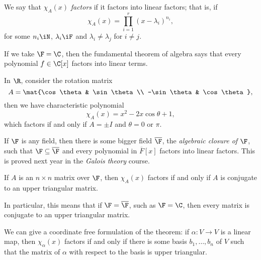 \begin{definition}
	We say that $\chi_A(x)$ \emph{factors} if it factors into linear factors; that is, if %
	\begin{equation*}
		\chi_A(x) =\prod_{i=1}^r \left( x-\lambda_i \right)^{n_i}, %
	\end{equation*}
	for some $n_i\iN$, $\lambda_i\iF$ and $\lambda_i\neq \lambda_j$ for $i\neq j$.
\end{definition}

\begin{examples}
	If we take $\F=\C$, then the fundamental theorem of algebra says that every polynomial $f\in\C[x]$ factors into linear terms. %
	
	In $\R$, consider the rotation matrix %
	\begin{equation*}
		A=\mat{\cos\theta & \sin\theta \\ -\sin\theta & \cos\theta},
	\end{equation*}
	then we have characteristic polynomial
	\begin{equation*}
		\chi_A(x) = x^2-2x\cos\theta+1,
	\end{equation*}
	which factors if and only if $A=\pm I$ and $\theta=0$ or $\pi$.
\end{examples}

\begin{definition}
	If $\F$ is any field, then there is some bigger field $\overline{\F}$, the \emph{algebraic closure of $\F$}, such that $\F \subseteq \overline{\F}$ and every polynomial in $\overline{F}[x]$ factors into linear factors. This is proved next year in the \emph{Galois theory} course. %
\end{definition}

\begin{theorem}
If $A$ is an $n\times n$ matrix over $\F$, then	$\chi_A(x)$ factors if and only if $A$  is conjugate to an upper triangular matrix. %
	
	In particular, this means that if $\F=\overline{\F}$, such as $\F=\C$, then every matrix is conjugate to an upper triangular matrix. %
\end{theorem}

We can give a coordinate free formulation of the theorem: if $\alpha:V\to V$ is a linear map, then $\chi_\alpha(x)$ factors if and only if there is some basis $b_1,\ldots,b_n$ of $V$ such that the matrix of $\alpha$ with respect to the basis is upper triangular.

